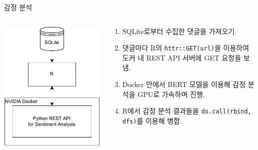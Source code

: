 \documentclass[mathserif, aspectratio=169]{beamer}
\begin{document}
\begin{frame}{감정 분석}
    \begin{columns}
        \begin{column}{0.3\linewidth}
            \centering
            \includegraphics[width = 0.8\linewidth]{images/sentiment_analysis.pdf}
        \end{column}
        \begin{column}{0.7\linewidth}
            \begin{enumerate}
                \item SQLite로부터 수집한 댓글을 가져오기.
                \item 댓글마다 R의 \texttt{httr::GET(url)}을 이용하여 도커 내 REST API 서버에 GET 요청을 보냄.
                \item Docker 안에서 BERT 모델을 이용해 감정 분석을 GPU로 가속하며 진행.
                \item R에서 감정 분석 결과들을 \texttt{do.call(rbind, dfs)}를 이용해 병합.
            \end{enumerate}
        \end{column}
    \end{columns}
\end{frame}
\end{document}
